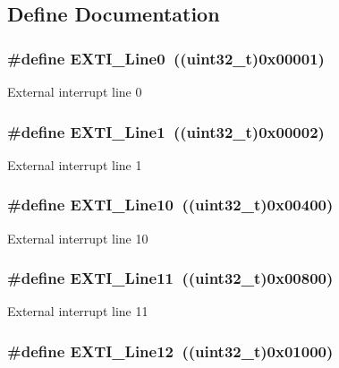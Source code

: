 \subsection{Define Documentation}
\hypertarget{group__EXTI__Lines_gac2a65680200dd5f4f7eab29cd4091a75}{
\subsubsection[{EXTI\_\-Line0}]{\setlength{\rightskip}{0pt plus 5cm}\#define EXTI\_\-Line0~((uint32\_\-t)0x00001)}}
\label{group__EXTI__Lines_gac2a65680200dd5f4f7eab29cd4091a75}
External interrupt line 0 \hypertarget{group__EXTI__Lines_gae7c6ab2a0880ce3810641ee0585104cd}{
\subsubsection[{EXTI\_\-Line1}]{\setlength{\rightskip}{0pt plus 5cm}\#define EXTI\_\-Line1~((uint32\_\-t)0x00002)}}
\label{group__EXTI__Lines_gae7c6ab2a0880ce3810641ee0585104cd}
External interrupt line 1 \hypertarget{group__EXTI__Lines_gaefb90b266f5fc1571ed4606bbff1f1d7}{
\subsubsection[{EXTI\_\-Line10}]{\setlength{\rightskip}{0pt plus 5cm}\#define EXTI\_\-Line10~((uint32\_\-t)0x00400)}}
\label{group__EXTI__Lines_gaefb90b266f5fc1571ed4606bbff1f1d7}
External interrupt line 10 \hypertarget{group__EXTI__Lines_ga6157b34c53e9b5cb8ee0d7ac3f5ba292}{
\subsubsection[{EXTI\_\-Line11}]{\setlength{\rightskip}{0pt plus 5cm}\#define EXTI\_\-Line11~((uint32\_\-t)0x00800)}}
\label{group__EXTI__Lines_ga6157b34c53e9b5cb8ee0d7ac3f5ba292}
External interrupt line 11 \hypertarget{group__EXTI__Lines_gab73a0a31f1814118955099b9dd3bdfef}{
\subsubsection[{EXTI\_\-Line12}]{\setlength{\rightskip}{0pt plus 5cm}\#define EXTI\_\-Line12~((uint32\_\-t)0x01000)}}
